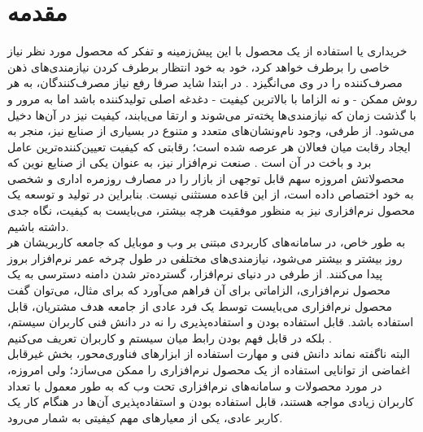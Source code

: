 \chapter{مقدمه}
خریداری یا استفاده از یک محصول با این پیش‌زمینه و تفکر که محصول مورد نظر نیاز خاصی را برطرف خواهد کرد، خود به خود انتظار برطرف کردن نیازمندی‌های ذهن مصرف‌کننده را در وی می‌انگیزد
\cite{___1389}.
در ابتدا شاید صرفا رفع نیاز مصرف‌کنندگان، به هر روش ممکن - و نه الزاما با بالاترین کیفیت - دغدغه اصلی تولیدکننده باشد اما به مرور و با گذشت زمان که نیازمندی‌ها پخته‌تر می‌شوند و ارتقا می‌یابند، کیفیت نیز در آن‌ها دخیل می‌شود. از طرفی، وجود نام‌ونشان‌های متعدد و متنوع در بسیاری از صنایع نیز، منجر به ایجاد رقابت میان فعالان هر عرصه شده است؛ رقابتی که کیفیت تعیین‌کننده‌ترین عامل برد و باخت در آن است
\cite{pressman_software_2015}.
صنعت نرم‌افزار نیز، به عنوان یکی از صنایع نوین که محصولاتش امروزه سهم قابل توجهی از بازار را در مصارف روزمره اداری و شخصی به خود اختصاص داده است، از این قاعده مستثنی نیست. بنابراین در تولید و توسعه یک محصول نرم‌افزاری نیز به منظور موفقیت هرچه بیشتر، می‌بایست به کیفیت، نگاه جدی داشته باشیم.\\
به طور خاص، در سامانه‌های کاربردی مبتنی بر وب و موبایل که جامعه کاربریشان هر روز بیشتر و بیشتر می‌شود، نیازمندی‌های مختلفی در طول چرخه عمر نرم‌افزار بروز پیدا می‌کنند. از طرفی در دنیای نرم‌افزار،  گسترده‌تر شدن دامنه دسترسی به یک محصول نرم‌افزاری، الزاماتی برای آن فراهم می‌آورد که برای مثال، می‌توان گفت محصول نرم‌افزاری می‌بایست توسط یک فرد عادی از جامعه هدف مشتریان، قابل استفاده باشد. قابل استفاده بودن و استفاده‌پذیری را نه در دانش فنی کاربران سیستم، بلکه در قابل فهم بودن رابط میان سیستم و کاربران تعریف می‌کنیم
\cite{albert_measuring_2013}.\\
البته ناگفته نماند دانش فنی و مهارت استفاده از ابزارهای فناوری‌محور، بخش غیرقابل اغماضی از توانایی استفاده از یک محصول نرم‌افزاری را ممکن می‌سازد؛ ولی امروزه، در مورد محصولات و سامانه‌های نرم‌افزاری تحت وب که به طور معمول با تعداد کاربران زیادی مواجه هستند، قابل استفاده بودن و استفاده‌پذیری آن‌ها در هنگام کار یک کاربر عادی، یکی از معیارهای مهم کیفیتی به شمار می‌رود.

